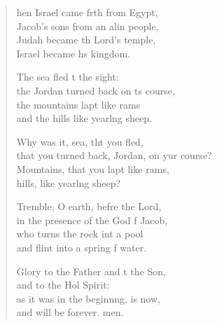 \settowidth{\versewidth}{that you turned back, Jordan, on your course?}
\begin{verse}%
  \begin{patverse}
hen Israel came frth from Egypt,\Med\\
Jacob’s sons from an alin people,\\
Judah became th Lord’s temple,\Med\\
Israel became h\pointup{\i}s kingdom.

The sea fled t the sight:\Med\\
the Jordan turned back on \pointup{\i}ts course,\\
the mountains lapt like rams\Med\\
and the hills like yearl\pointup{\i}ng sheep.

Why was it, sea, tht you fled,\Med\\
that you turned back, Jordan, on yur course?\\
Mountains, that you lapt like rams,\Med\\
hills, like yearl\pointup{\i}ng sheep?

Tremble, O earth, befre the Lord,\Med\\
in the presence of the God f Jacob,\\
who turns the rock int a pool\Med\\
and flint into a spring f water.

Glory to the Father and t the Son,\Med\\
and to the Hol Spirit:\\
as it was in the beginn\pointup{\i}ng, is now,\Med\\
and will be forever. men.
  \end{patverse}
\end{verse}
